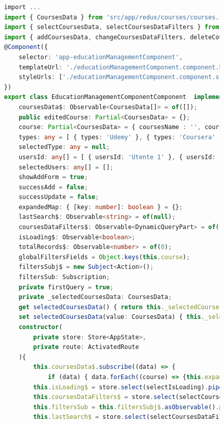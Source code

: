 \begin{figure}[H]
\centering
\begin{lstlisting}[language=TypeScript, linewidth=20cm, basicstyle=\tiny]
import ...
import { CoursesData } from 'src/app/redux/courses/courses.state';
import { selectCoursesData, selectCoursesDataFilters } from 'src/app/redux/courses/courses.selectors';
import { addCoursesData, changeCoursesDataFilters, deleteCoursesData, updateCoursesData } from 'src/app/redux/courses/courses.actions';
@Component({
    selector: 'app-educationManagementComponent',
    templateUrl: './educationManagementComponent.component.html',
    styleUrls: ['./educationManagementComponent.component.scss'],
})
export class EducationManagementComponentComponent  implements OnInit, OnDestroy{
    coursesData$: Observable<CoursesData[]> = of([]);
    public editedCourse: Partial<CoursesData> = {};
    course: Partial<CoursesData> = { coursesName : '', coursesCapacity : null, coursesType: '', coursesDate: '' };
    types: any = [ { types: 'Udemy' }, { types: 'Coursera' }, { types: 'brilliant' }, { types: 'UniGe' }, { types: 'Angular University' } ];
    selectedType: any = null;
    usersId: any[] = [ { usersId: 'Utente 1' }, { usersId: 'Utente 2' }, { usersId: 'Utente 3' }, ];
    selectedUsers: any[] = [];
    showAddForm = true;
    successAdd = false;
    successUpdate = false;
    expandedMap: { [key: number]: boolean } = {};
    lastSearch$: Observable<string> = of(null);
    coursesDataFilters$: Observable<DynamicQueryPart> = of({});
    isLoading$: Observable<boolean>;
    totalRecords$: Observable<number> = of(0);
    globalFiltersFields = Object.keys(this.course);
    filtersSubj$ = new Subject<Action>();
    filtersSub: Subscription;
    private firstQuery = true;
    private _selectedCoursesData: CoursesData;
    get selectedCoursesData() { return this._selectedCoursesData; }
    set selectedCoursesData(value: CoursesData) { this._selectedCoursesData = value; }
    constructor(
        private store: Store<AppState>,
        private route: ActivatedRoute
    ){
        this.coursesData$.subscribe((data) => {
            if (data) { data.forEach((course) => {this.expandedMap[course.coursesId] = false; }); } });
        this.isLoading$ = store.select(selectIsLoading).pipe(distinctUntilChanged());
        this.coursesDataFilters$ = store.select(selectCoursesDataFilters);
        this.filtersSub = this.filtersSubj$.asObservable().pipe(debounceTime(1000)).subscribe((a) => this.store.dispatch(a));
        this.lastSearch$ = store.select(selectCoursesDataFilters).pipe(take(1), map((f) => f.filtering && f.filtering.length > 0 ? f.filtering[0]        .value : ''));

\end{lstlisting}
\end{figure}
